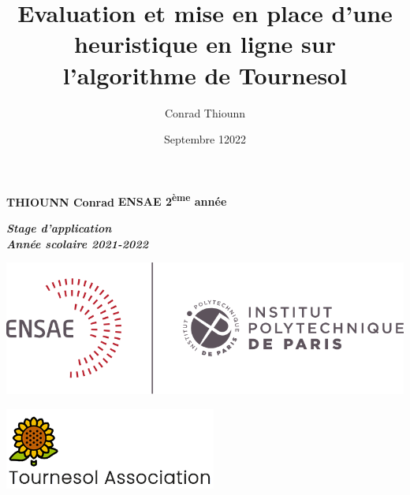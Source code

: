 \documentclass[hidelinks, 12pt]{article}
\title{Evaluation et mise en place d'une heuristique en ligne sur l'algorithme de Tournesol }
\author{
Conrad Thiounn }
\date{Septembre 12022}
\begin{document}
%
%
%

\begin{titlingpage}
\noindent
\textbf{\Large{THIOUNN Conrad}} \hfill
\textbf{\Large{ENSAE 2\textsuperscript{ème} année}} 
\begin{flushright}
\begin{minipage}{5.4cm}
\begin{center}
\textbf{\emph{\large{Stage d'application \\
Année scolaire 2021-2022 }}} 
\end{center}
\end{minipage}
\end{flushright}

\begin{flushright}
\includegraphics[scale=0.3]{ensae.png}
\end{flushright}
\vspace{5.5cm}

\hspace*{-\parindent}%

\vspace{5.5cm}

\noindent \includegraphics[scale=0.7]{logo_tournesol.png}


\end{titlingpage}
\end{document}
